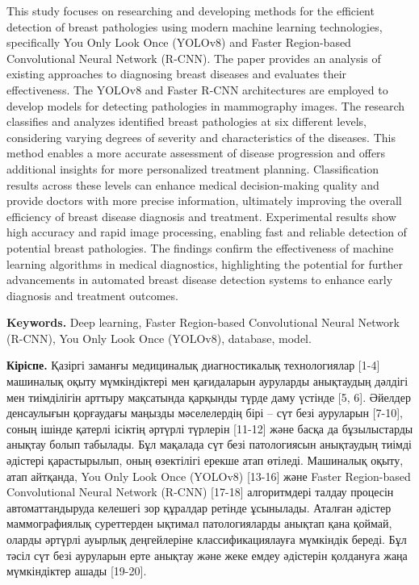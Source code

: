 This study focuses on researching and developing methods for the
efficient detection of breast pathologies using modern machine learning
technologies, specifically You Only Look Once (YOLOv8) and Faster
Region-based Convolutional Neural Network (R-CNN). The paper provides an
analysis of existing approaches to diagnosing breast diseases and
evaluates their effectiveness. The YOLOv8 and Faster R-CNN architectures
are employed to develop models for detecting pathologies in mammography
images. The research classifies and analyzes identified breast
pathologies at six different levels, considering varying degrees of
severity and characteristics of the diseases. This method enables a more
accurate assessment of disease progression and offers additional
insights for more personalized treatment planning. Classification
results across these levels can enhance medical decision-making quality
and provide doctors with more precise information, ultimately improving
the overall efficiency of breast disease diagnosis and treatment.
Experimental results show high accuracy and rapid image processing,
enabling fast and reliable detection of potential breast pathologies.
The findings confirm the effectiveness of machine learning algorithms in
medical diagnostics, highlighting the potential for further advancements
in automated breast disease detection systems to enhance early diagnosis
and treatment outcomes.

{\bfseries Keywords.} Deep learning, Faster Region-based Convolutional
Neural Network (R-CNN), You Only Look Once (YOLOv8), database, model.

{\bfseries Кіріспе.} Қазіргі заманғы медициналық диагностикалық
технологиялар {[}1-4{]} машиналық оқыту мүмкіндіктері мен қағидаларын
ауруларды анықтаудың дәлдігі мен тиімділігін арттыру мақсатында қарқынды
түрде даму үстінде {[}5, 6{]}. Әйелдер денсаулығын қорғаудағы маңызды
мәселелердің бірі -- сүт безі ауруларын {[}7-10{]}, соның ішінде қатерлі
ісіктің әртүрлі түрлерін {[}11-12{]} және басқа да бұзылыстарды анықтау
болып табылады. Бұл мақалада сүт безі патологиясын анықтаудың тиімді
әдістері қарастырылып, оның өзектілігі ерекше атап өтіледі. Машиналық
оқыту, атап айтқанда, You Only Look Once (YOLOv8) {[}13-16{]} және
Faster Region-based Convolutional Neural Network (R-CNN) {[}17-18{]}
алгоритмдері талдау процесін автоматтандыруда келешегі зор құралдар
ретінде ұсынылады. Аталған әдістер маммографиялық суреттерден ықтимал
патологияларды анықтап қана қоймай, оларды әртүрлі ауырлық деңгейлеріне
классификациялауға мүмкіндік береді. Бұл тәсіл сүт безі ауруларын ерте
анықтау және жеке емдеу әдістерін қолдануға жаңа мүмкіндіктер ашады
{[}19-20{]}.

